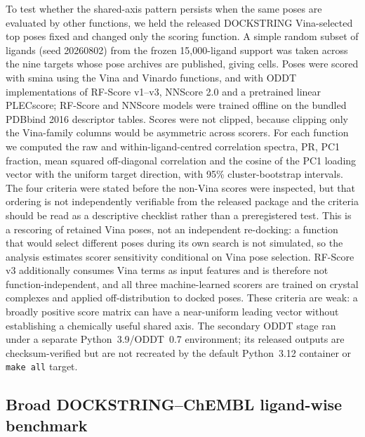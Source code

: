 \documentclass[11pt]{article}
\begin{document}
To test whether the shared-axis pattern persists when the same poses are evaluated by other
functions, we held the released DOCKSTRING Vina-selected top poses fixed and changed only the
scoring function. A simple random subset of \TransportLigands{} ligands
(seed 20260802) from the frozen 15,000-ligand support was taken across the nine targets whose
pose archives are published, giving \TransportCells{} cells. Poses were scored with smina
using the Vina and Vinardo functions, and with ODDT implementations of RF-Score v1--v3,
NNScore 2.0 and a pretrained linear PLECscore; RF-Score and NNScore models were trained
offline on the bundled PDBbind 2016 descriptor tables. Scores were not clipped, because
clipping only the Vina-family columns would be asymmetric across scorers. For each function
we computed the raw and within-ligand-centred correlation spectra, PR, PC1 fraction, mean
squared off-diagonal correlation and the cosine of the PC1 loading vector with the uniform
target direction, with 95\% cluster-bootstrap intervals. The four criteria were stated before the
non-Vina scores were inspected, but that ordering is not independently verifiable from the
released package and the criteria should be read as a descriptive checklist rather than a
preregistered test. This is a rescoring of retained Vina poses, not an independent
re-docking: a function that would select different poses during its own search is not
simulated, so the analysis estimates scorer sensitivity conditional on Vina pose selection.
RF-Score v3 additionally consumes Vina terms as input features and is therefore not
function-independent, and all three machine-learned scorers are trained on crystal complexes
and applied off-distribution to docked poses. These criteria are weak: a broadly positive
score matrix can have a near-uniform leading vector without establishing a chemically useful
shared axis. The secondary ODDT stage ran under a separate Python~3.9/ODDT~0.7 environment;
its released outputs are checksum-verified but are not recreated by the default Python~3.12
container or \texttt{make all} target.

\subsection{Broad DOCKSTRING--ChEMBL ligand-wise benchmark}
\end{document}
